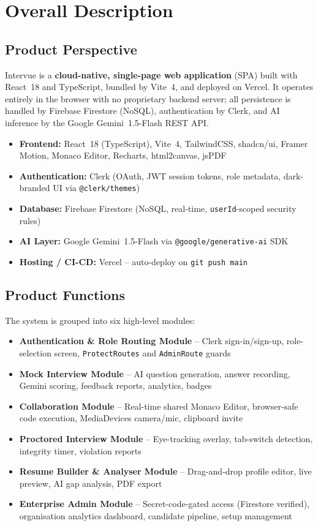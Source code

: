 \documentclass{fisatinternship}
\begin{document}
\chapter{Overall Description}

\section{Product Perspective}
Intervue is a \textbf{cloud-native, single-page web application} (SPA) built with
React~18 and TypeScript, bundled by Vite~4, and deployed on Vercel. It operates entirely
in the browser with no proprietary backend server; all persistence is handled by
Firebase Firestore (NoSQL), authentication by Clerk, and AI inference by the Google
Gemini~1.5-Flash REST API.

\begin{itemize}
  \item \textbf{Frontend:} React~18 (TypeScript), Vite~4, TailwindCSS, shadcn/ui,
        Framer Motion, Monaco Editor, Recharts, html2canvas, jsPDF
  \item \textbf{Authentication:} Clerk (OAuth, JWT session tokens, role metadata,
        dark-branded UI via \texttt{@clerk/themes})
  \item \textbf{Database:} Firebase Firestore (NoSQL, real-time, \texttt{userId}-scoped security rules)
  \item \textbf{AI Layer:} Google Gemini~1.5-Flash via \texttt{@google/generative-ai} SDK
  \item \textbf{Hosting / CI-CD:} Vercel -- auto-deploy on \texttt{git push main}
\end{itemize}

\section{Product Functions}
The system is grouped into six high-level modules:
\begin{itemize}
  \item \textbf{Authentication \& Role Routing Module} -- Clerk sign-in/sign-up,
        role-selection screen, \texttt{ProtectRoutes} and \texttt{AdminRoute} guards
  \item \textbf{Mock Interview Module} -- AI question generation, answer recording,
        Gemini scoring, feedback reports, analytics, badges
  \item \textbf{Collaboration Module} -- Real-time shared Monaco Editor, browser-safe
        code execution, MediaDevices camera/mic, clipboard invite
  \item \textbf{Proctored Interview Module} -- Eye-tracking overlay, tab-switch detection,
        integrity timer, violation reports
  \item \textbf{Resume Builder \& Analyser Module} -- Drag-and-drop profile editor,
        live preview, AI gap analysis, PDF export
  \item \textbf{Enterprise Admin Module} -- Secret-code-gated access (Firestore verified),
        organisation analytics dashboard, candidate pipeline, setup management
\end{itemize}
\end{document}
